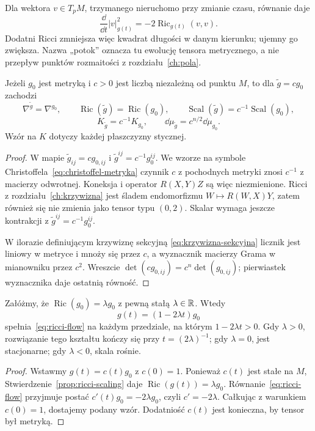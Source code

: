 Dla wektora $v\in T_pM$, trzymanego nieruchomo przy zmianie
czasu, równanie daje
\[
 \frac{\dd}{\dd t}|v|_{g(t)}^2
 =-2\operatorname{Ric}_{g(t)}(v,v).
\]
Dodatni Ricci zmniejsza więc kwadrat długości w danym
kierunku; ujemny go zwiększa. Nazwa „potok” oznacza tu
ewolucję tensora metrycznego, a nie przepływ punktów
rozmaitości z rozdziału~\ref{ch:pola}.

\begin{samepage}
\begin{stwierdzenie}
\label{prop:ricci-scaling}
Jeżeli $g_0$ jest metryką i $c>0$ jest liczbą niezależną
od punktu $M$, to dla $\widetilde g=cg_0$ zachodzi
\[
 \nabla^{\widetilde g}=\nabla^{g_0},\qquad
 \operatorname{Ric}(\widetilde g)=\operatorname{Ric}(g_0),
 \qquad \operatorname{Scal}(\widetilde g)
          =c^{-1}\operatorname{Scal}(g_0),
\]
\[
 K_{\widetilde g}=c^{-1}K_{g_0},\qquad
 \dd\mu_{\widetilde g}=c^{n/2}\dd\mu_{g_0}.
\]
Wzór na $K$ dotyczy każdej płaszczyzny stycznej.
\end{stwierdzenie}
\end{samepage}
\begin{proof}
W mapie $\widetilde g_{ij}=cg_{0,ij}$ i
$\widetilde g^{ij}=c^{-1}g_0^{ij}$. We wzorze na symbole
Christoffela~\eqref{eq:christoffel-metryka} czynnik $c$
z pochodnych metryki znosi $c^{-1}$ z macierzy
odwrotnej. Koneksja i operator $R(X,Y)Z$ są więc
niezmienione. Ricci z rozdziału~\ref{ch:krzywizna}
jest śladem endomorfizmu $W\mapsto R(W,X)Y$, zatem
również się nie zmienia jako tensor typu $(0,2)$.
Skalar wymaga jeszcze kontrakcji z
$\widetilde g^{ij}=c^{-1}g_0^{ij}$.

W ilorazie definiującym krzywiznę sekcyjną
\eqref{eq:krzywizna-sekcyjna} licznik jest liniowy
w metryce i mnoży się przez $c$, a wyznacznik
macierzy Grama w mianowniku przez $c^2$. Wreszcie
$\det(cg_{0,ij})=c^n\det(g_{0,ij})$; pierwiastek
wyznacznika daje ostatnią równość.
\end{proof}

\begin{stwierdzenie}
\label{prop:ricci-einstein-flow}
Załóżmy, że $\operatorname{Ric}(g_0)=\lambda g_0$
z pewną stałą $\lambda\in\mathbb{R}$. Wtedy
\begin{equation}\label{eq:ricci-einstein-solution}
 g(t)=(1-2\lambda t)g_0
\end{equation}
spełnia~\eqref{eq:ricci-flow} na każdym przedziale,
na którym $1-2\lambda t>0$. Gdy $\lambda>0$,
rozwiązanie tego kształtu kończy się przy
$t=(2\lambda)^{-1}$; gdy $\lambda=0$, jest stacjonarne;
gdy $\lambda<0$, skala rośnie.
\end{stwierdzenie}
\begin{proof}
Wstawmy $g(t)=c(t)g_0$ z $c(0)=1$. Ponieważ
$c(t)$ jest stałe na $M$, Stwierdzenie~\ref{prop:ricci-scaling}
daje $\operatorname{Ric}(g(t))=\lambda g_0$.
Równanie~\eqref{eq:ricci-flow} przyjmuje postać
$c'(t)g_0=-2\lambda g_0$, czyli $c'=-2\lambda$.
Całkując z warunkiem $c(0)=1$, dostajemy podany wzór.
Dodatniość $c(t)$ jest konieczna, by tensor był metryką.
\end{proof}

